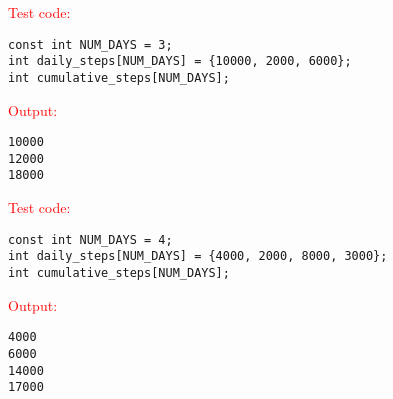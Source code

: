 \begin{sample}
\textcolor{red}{Test code:}
\begin{verbatim}
const int NUM_DAYS = 3;
int daily_steps[NUM_DAYS] = {10000, 2000, 6000};
int cumulative_steps[NUM_DAYS];
\end{verbatim}
\textcolor{red}{Output:}
\begin{verbatim}
10000
12000
18000
\end{verbatim}
\end{sample}

\begin{sample}
\textcolor{red}{Test code:}
\begin{verbatim}
const int NUM_DAYS = 4;
int daily_steps[NUM_DAYS] = {4000, 2000, 8000, 3000};
int cumulative_steps[NUM_DAYS];
\end{verbatim}
\textcolor{red}{Output:}
\begin{verbatim}
4000
6000
14000
17000
\end{verbatim}
\end{sample}

